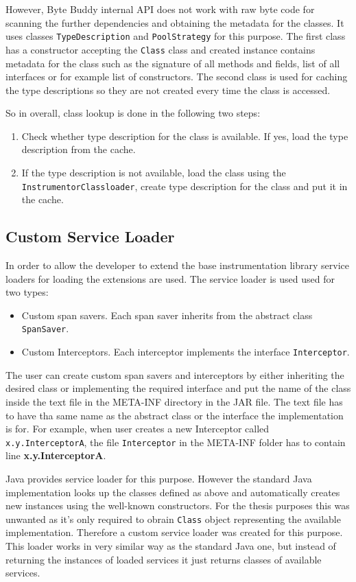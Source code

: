 However, Byte Buddy internal API does not work with raw byte code for scanning the further dependencies and obtaining the metadata for the classes. It uses classes \texttt{TypeDescription} and \texttt{PoolStrategy} for this purpose. The first class has a constructor accepting the \texttt{Class} class and created instance contains metadata for the class such as the signature of all methods and fields, list of all interfaces or for example list of constructors. The second class is used for caching the type descriptions so they are not created every time the class is accessed. 

So in overall, class lookup is done in the following two steps:
\begin{enumerate}
	\item Check whether type description for the class is available. If yes, load the type description from the cache.
	\item If the type description is not available, load the class using the \newline \texttt{InstrumentorClassloader}, create type description for the class and put it in the cache.
\end{enumerate}

\subsection{Custom Service Loader}
In order to allow the developer to extend the base instrumentation library service loaders for loading the extensions are used. The service loader is used used for two types: 
\begin{itemize}
	\item Custom span savers. Each span saver inherits from the abstract class \texttt{SpanSaver}.
	\item Custom Interceptors. Each interceptor implements the interface \texttt{Interceptor}.
\end{itemize} 
The user can create custom span savers and interceptors by either inheriting the desired class or implementing the required interface and put the name of the class inside the text file in the META-INF directory in the JAR file. The text file has to have tha same name as the abstract class or the interface the implementation is for. For example, when user creates a new Interceptor called \texttt{x.y.InterceptorA}, the file \texttt{Interceptor} in the META-INF folder has to contain line \textbf{x.y.InterceptorA}.

Java provides service loader for this purpose. However the standard Java implementation looks up the classes defined as above and automatically creates new instances using the well-known constructors. For the thesis purposes this was unwanted as it's only required to obrain \texttt{Class} object representing the available implementation. Therefore a custom service loader was created for this purpose. This loader works in very similar way as the standard Java one, but instead of returning the instances of loaded services it just returns classes of available services. 

